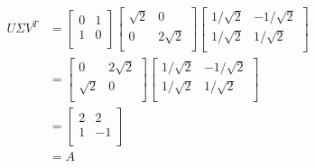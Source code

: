 \documentclass[11pt]{article}
\begin{document}
$$\begin{aligned}
U \Sigma V^T &= \begin{bmatrix}
0 & 1 \\
1 & 0 \\
\end{bmatrix} \begin{bmatrix}
\sqrt2 & 0 \\
0 & 2 \sqrt2 \\
\end{bmatrix} \begin{bmatrix}
1 / \sqrt2 & -1 / \sqrt2 \\
1 / \sqrt2 & 1 / \sqrt2 \\
\end{bmatrix} \\
&= \begin{bmatrix}
0 & 2 \sqrt2 \\
\sqrt2 & 0 \\
\end{bmatrix} \begin{bmatrix}
1 / \sqrt2 & -1 / \sqrt2 \\
1 / \sqrt2 & 1 / \sqrt2 \\
\end{bmatrix} \\
&= \begin{bmatrix}
2 & 2 \\
1 & -1 \\
\end{bmatrix} \\
&= \boxed{A}
\end{aligned} $$
\end{document}
